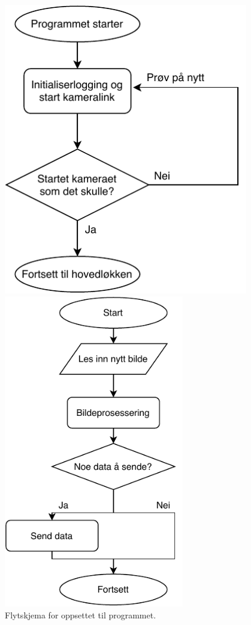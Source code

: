 \begin{figure}[!htbp]
\begin{minipage}[b]{0.3\textwidth}
    \includegraphics[width=0.95\textwidth]{implementering/Program/oppstart.pdf}
    \caption{Flytskjema for oppsettet til programmet.}
    \label{fig:hovedprogram_oppstart}
\end{minipage}
\hfill
\begin{minipage}[b]{0.3\textwidth}
    \centering
    \includegraphics[width=0.7\textwidth]{implementering/Program/main_loop.pdf}

\end{minipage}
\end{figure}
